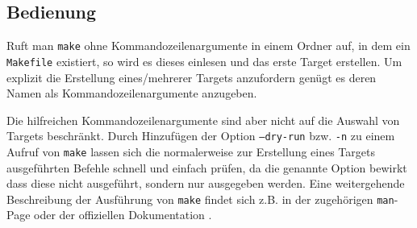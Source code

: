 			{
			\footnotesize
			\inputminted[linenos=true,stepnumber=5]{make}{../code/Worm080_Makefile}
			}
		\clearpage

\subsection{Bedienung}

	Ruft man \texttt{make} ohne Kommandozeilenargumente in einem Ordner auf, in
	dem ein \texttt{Makefile} existiert, so wird es dieses einlesen und das
	erste Target erstellen.
	Um explizit die Erstellung eines/mehrerer Targets anzufordern genügt es
	deren Namen als Kommandozeilenargumente anzugeben.

	Die hilfreichen Kommandozeilenargumente sind aber nicht auf die Auswahl von
	Targets beschränkt. Durch Hinzufügen der Option \texttt{--dry-run} bzw.
	\texttt{-n} zu einem Aufruf von \texttt{make} lassen sich die normalerweise
	zur Erstellung eines Targets ausgeführten Befehle schnell und einfach
	prüfen, da die genannte Option bewirkt dass diese nicht ausgeführt, sondern
	nur ausgegeben werden.
	Eine weitergehende Beschreibung der Ausführung von \texttt{make} findet sich
	z.B. in der zugehörigen \texttt{man}-Page oder der offiziellen Dokumentation
	.
